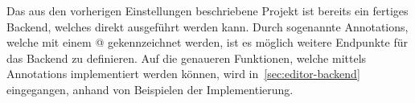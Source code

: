 Das aus den vorherigen Einstellungen beschriebene Projekt ist bereits ein fertiges Backend, welches direkt ausgeführt werden kann.
Durch sogenannte Annotations, welche mit einem @ gekennzeichnet werden, ist es möglich weitere Endpunkte für das Backend zu definieren.
Auf die genaueren Funktionen, welche mittels Annotations implementiert werden können, wird in~\ref{sec:editor-backend} eingegangen, anhand von Beispielen der Implementierung.

